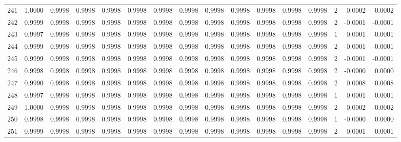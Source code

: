 \begin{tabular}{lrrrrrrrrrrrrrrr}
241 &      1.0000 &  0.9998 &  0.9998 &  0.9998 &  0.9998 &  0.9998 &  0.9998 &  0.9998 &  0.9998 &  0.9998 &   0.9998 &     0.9998 &      2 &                   -0.0002 &                    -0.0002 \\
242 &      0.9999 &  0.9998 &  0.9998 &  0.9998 &  0.9998 &  0.9998 &  0.9998 &  0.9998 &  0.9998 &  0.9998 &   0.9998 &     0.9998 &      2 &                   -0.0001 &                    -0.0001 \\
243 &      0.9997 &  0.9998 &  0.9998 &  0.9998 &  0.9998 &  0.9998 &  0.9998 &  0.9998 &  0.9998 &  0.9998 &   0.9998 &     0.9998 &      1 &                    0.0001 &                     0.0001 \\
244 &      0.9999 &  0.9998 &  0.9998 &  0.9998 &  0.9998 &  0.9998 &  0.9998 &  0.9998 &  0.9998 &  0.9998 &   0.9998 &     0.9998 &      2 &                   -0.0001 &                    -0.0001 \\
245 &      0.9999 &  0.9998 &  0.9998 &  0.9998 &  0.9998 &  0.9998 &  0.9998 &  0.9998 &  0.9998 &  0.9998 &   0.9998 &     0.9998 &      2 &                   -0.0001 &                    -0.0001 \\
246 &      0.9998 &  0.9998 &  0.9998 &  0.9998 &  0.9998 &  0.9998 &  0.9998 &  0.9998 &  0.9998 &  0.9998 &   0.9998 &     0.9998 &      2 &                   -0.0000 &                     0.0000 \\
247 &      0.9990 &  0.9998 &  0.9998 &  0.9998 &  0.9998 &  0.9998 &  0.9998 &  0.9998 &  0.9998 &  0.9998 &   0.9998 &     0.9998 &      2 &                    0.0008 &                     0.0008 \\
248 &      0.9997 &  0.9998 &  0.9998 &  0.9998 &  0.9998 &  0.9998 &  0.9998 &  0.9998 &  0.9998 &  0.9998 &   0.9998 &     0.9998 &      1 &                    0.0001 &                     0.0001 \\
249 &      1.0000 &  0.9998 &  0.9998 &  0.9998 &  0.9998 &  0.9998 &  0.9998 &  0.9998 &  0.9998 &  0.9998 &   0.9998 &     0.9998 &      2 &                   -0.0002 &                    -0.0002 \\
250 &      0.9998 &  0.9998 &  0.9998 &  0.9998 &  0.9998 &  0.9998 &  0.9998 &  0.9998 &  0.9998 &  0.9998 &   0.9998 &     0.9998 &      1 &                   -0.0000 &                     0.0000 \\
251 &      0.9999 &  0.9998 &  0.9998 &  0.9998 &  0.9998 &  0.9998 &  0.9998 &  0.9998 &  0.9998 &  0.9998 &   0.9998 &     0.9998 &      2 &                   -0.0001 &                    -0.0001 \\

\end{tabular}
